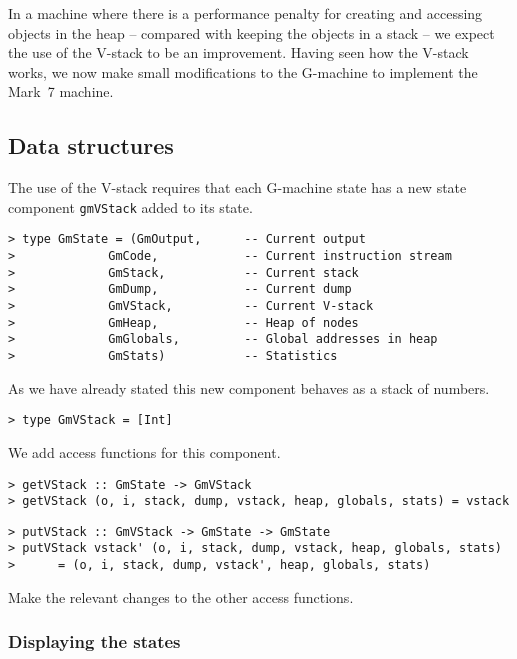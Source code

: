In a machine where there is a performance penalty for creating and
accessing objects in the heap -- compared with keeping the objects in
a stack -- we expect the use of the V-stack to be an improvement.
Having seen how the V-stack works, we now make small modifications to
the G-machine to implement the Mark~7 machine.

\subsection{Data structures}

The use of the V-stack requires that each G-machine state has a new
state component \mbox{\tt gmVStack} added to its state.
\begin{verbatim}
> type GmState = (GmOutput,      -- Current output
>             GmCode,            -- Current instruction stream
>             GmStack,           -- Current stack
>             GmDump,            -- Current dump
>             GmVStack,          -- Current V-stack
>             GmHeap,            -- Heap of nodes
>             GmGlobals,         -- Global addresses in heap
>             GmStats)           -- Statistics
\end{verbatim}
%
As we have already stated this new component behaves as a stack of
numbers.
\begin{verbatim}
> type GmVStack = [Int]
\end{verbatim}
%
We add access functions for this component.
\begin{verbatim}
> getVStack :: GmState -> GmVStack
> getVStack (o, i, stack, dump, vstack, heap, globals, stats) = vstack
\end{verbatim}
%
%
\begin{verbatim}
> putVStack :: GmVStack -> GmState -> GmState
> putVStack vstack' (o, i, stack, dump, vstack, heap, globals, stats)
>      = (o, i, stack, dump, vstack', heap, globals, stats)
\end{verbatim}
%
%
\begin{exercise}\label{gm:X:access7}
Make the relevant changes to the other access functions.
\end{exercise}

\subsubsection{Displaying the states}

